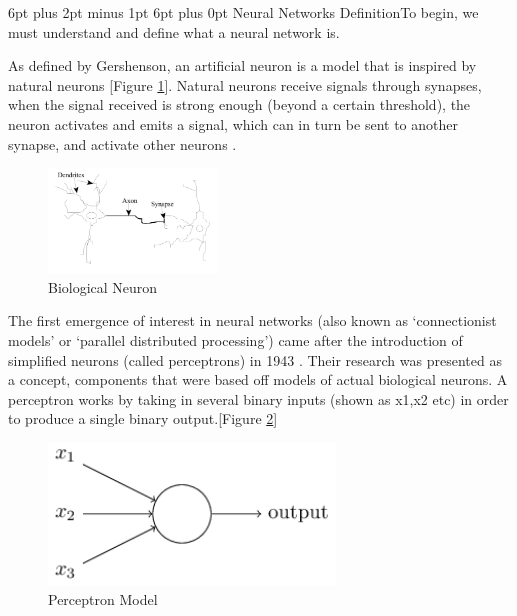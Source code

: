 \documentclass[12pt,a4paper]{article}
\makeatletter
\renewcommand\subsection{\@startsection {subsection}{1}{2mm} %
                               {6pt plus 2pt minus 1pt} %
                               {6pt plus 0pt} %
                               {\normalfont\bfseries}}
\makeatother
\begin{document}
\subsection{Neural Networks Definition}To begin, we must understand and define what a neural network is.\par
As defined by Gershenson, an artificial neuron is a model that is inspired by natural neurons [Figure \ref{fig:5}]. Natural neurons receive signals through synapses, when the signal received is strong enough (beyond a certain threshold), the neuron activates and emits a signal, which can in turn be sent to another synapse, and activate other neurons \cite{gershenson_artificial_2003}.\par
\begin{figure}[h]
	\includegraphics[width=0.4\textwidth]{neuron}
	\centering
	\caption{Biological Neuron \protect \cite{gershenson_artificial_2003}}
	\label{fig:5}
\end{figure}
The first emergence of interest in neural networks (also known as ‘connectionist models’ or ‘parallel distributed processing’) \cite{ben_krose_introduction_1993} came after the introduction of simplified neurons (called perceptrons) in 1943 \cite{mcculloch_logical_1943}. Their research was presented as a concept, components that were based off models of actual biological neurons. A perceptron works by taking in several binary inputs (shown as x1,x2 etc)  in order to produce a single binary output.[Figure \ref{fig:1}]
\begin{figure}[ht]
	\includegraphics[width=0.68\textwidth]{perceptron}
	\centering
	\caption{Perceptron Model \protect \cite{nielsen_neural_2018}}
	\label{fig:1}
\end{figure}
\par
\end{document}
